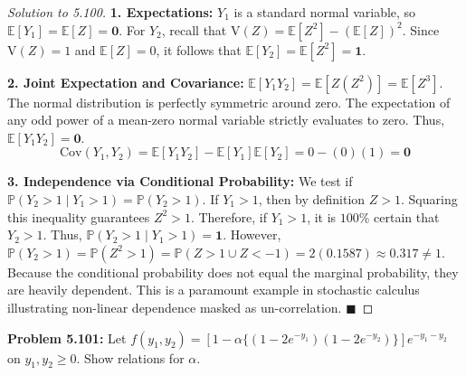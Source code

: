 \documentclass[11pt, a4paper]{article}
\theoremstyle{definition}
\theoremstyle{remark}
\newcommand{\E}{\mathbb{E}}
\newcommand{\Prob}{\mathbb{P}}
\newcommand{\Cov}{\mathrm{Cov}}
\newcommand{\Var}{\mathrm{V}}
\begin{document}
\begin{proof}[Solution to 5.100]
\textbf{1. Expectations:}
$Y_1$ is a standard normal variable, so $\E[Y_1] = \E[Z] = \mathbf{0}$.
For $Y_2$, recall that $\Var(Z) = \E[Z^2] - (\E[Z])^2$. Since $\Var(Z)=1$ and $\E[Z]=0$, it follows that $\E[Y_2] = \E[Z^2] = \mathbf{1}$.

\textbf{2. Joint Expectation and Covariance:}
$\E[Y_1 Y_2] = \E[Z(Z^2)] = \E[Z^3]$. The normal distribution is perfectly symmetric around zero. The expectation of any odd power of a mean-zero normal variable strictly evaluates to zero. Thus, $\E[Y_1 Y_2] = \mathbf{0}$.
\[
\Cov(Y_1, Y_2) = \E[Y_1 Y_2] - \E[Y_1]\E[Y_2] = 0 - (0)(1) = \mathbf{0}
\]

\textbf{3. Independence via Conditional Probability:}
We test if $\Prob(Y_2 > 1 \mid Y_1 > 1) = \Prob(Y_2 > 1)$.
If $Y_1 > 1$, then by definition $Z > 1$. Squaring this inequality guarantees $Z^2 > 1$. Therefore, if $Y_1 > 1$, it is $100\%$ certain that $Y_2 > 1$.
Thus, $\Prob(Y_2 > 1 \mid Y_1 > 1) = \mathbf{1}$.
However, $\Prob(Y_2 > 1) = \Prob(Z^2 > 1) = \Prob(Z > 1 \cup Z < -1) = 2(0.1587) \approx 0.317 \neq 1$.
Because the conditional probability does not equal the marginal probability, they are heavily dependent. This is a paramount example in stochastic calculus illustrating non-linear dependence masked as un-correlation. $\blacksquare$
\end{proof}

\vspace{1em}
\noindent\textbf{Problem 5.101:} Let $f(y_1, y_2) = [1 - \alpha\{(1-2e^{-y_1})(1-2e^{-y_2})\}]e^{-y_1-y_2}$ on $y_1, y_2 \ge 0$. Show relations for $\alpha$.
\end{document}
